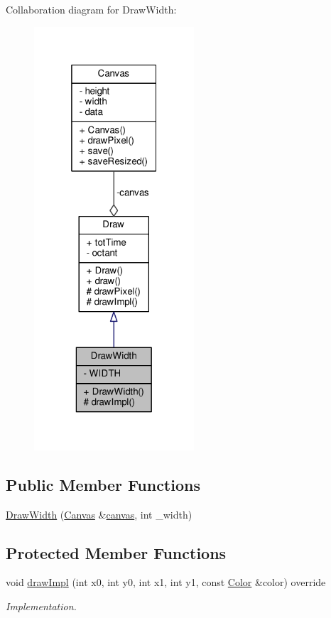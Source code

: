 Collaboration diagram for Draw\+Width\+:\nopagebreak
\begin{figure}[H]
\begin{center}
\leavevmode
\includegraphics[width=169pt]{classDrawWidth__coll__graph}
\end{center}
\end{figure}
\subsection*{Public Member Functions}
\begin{DoxyCompactItemize}
\item 
\hyperlink{classDrawWidth_af073f8b445c1411582a6f2c2027ec8bd}{Draw\+Width} (\hyperlink{classCanvas}{Canvas} \&\hyperlink{classDraw_a72ed77716d9eb7068414f0e4e00753bd}{canvas}, int \+\_\+width)
\end{DoxyCompactItemize}
\subsection*{Protected Member Functions}
\begin{DoxyCompactItemize}
\item 
void \hyperlink{classDrawWidth_a566f96378bc924c2362551c062612131}{draw\+Impl} (int x0, int y0, int x1, int y1, const \hyperlink{canvas_8h_a084a39206618848fb8bc9187d3758c87}{Color} \&color) override
\begin{DoxyCompactList}\small\item\em Implementation. \end{DoxyCompactList}\end{DoxyCompactItemize}

